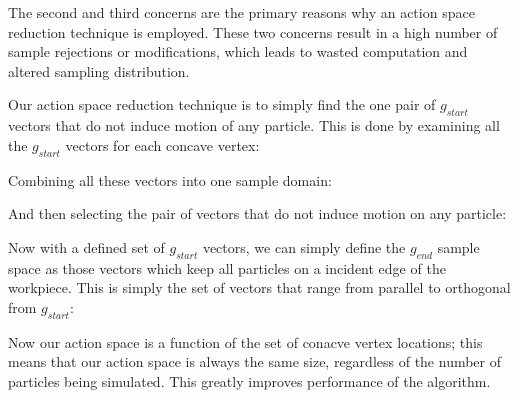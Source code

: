 The second and third concerns are the primary reasons why an action space reduction technique is employed. These two concerns result in a high number of sample rejections or modifications, which leads to wasted computation and altered sampling distribution.

Our action space reduction technique is to simply find the one pair of $g_{start}$ vectors that do not induce motion of any particle. This is done by examining all the $g_{start}$ vectors for each concave vertex:


Combining all these vectors into one sample domain:


And then selecting the pair of vectors that do not induce motion on any particle:


Now with a defined set of $g_{start}$ vectors, we can simply define the $g_{end}$ sample space as those vectors which keep all particles on a incident edge of the workpiece. This is simply the set of vectors that range from parallel to orthogonal from $g_{start}$:



Now our action space is a function of the set of conacve vertex locations; this means that our action space is always the same size, regardless of the number of particles being simulated. This greatly improves performance of the algorithm.

